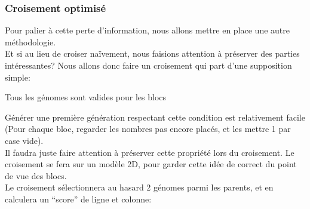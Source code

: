             \subsubsection{Croisement optimisé}
                Pour palier à cette perte d'information, nous allons mettre en place une autre méthodologie.\\
                Et si au lieu de croiser naïvement, nous faisions attention à préserver des parties intéressantes?
                    Nous allons donc faire un croisement qui part d'une supposition simple:\\
                    \begin{center}
                        Tous les génomes sont valides pour les blocs
                    \end{center}
                    Générer une première génération respectant cette condition est relativement facile (Pour chaque bloc, regarder les nombres pas encore placés, et les mettre 1 par case vide).\\
                    Il faudra juste faire attention à préserver cette propriété lors du croisement.
                    Le croisement se fera sur un modèle 2D, pour garder cette idée de correct du point de vue des blocs.\\
                    Le croisement sélectionnera au hasard 2 génomes parmi les parents, et en calculera un ``score'' de ligne et colonne:\\
